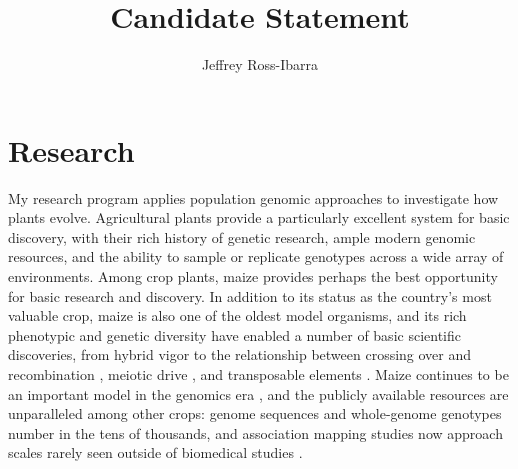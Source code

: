 \documentclass[11pt,letterpaper]{article}
\begin{document}
\title{\vspace{-5ex}Candidate Statement\vspace{-4ex}}
\author{Jeffrey Ross-Ibarra}
\date{}
\maketitle

\section*{Research}

My research program applies population genomic approaches to investigate how plants evolve.
Agricultural plants provide a particularly excellent system for basic discovery, with their rich history of genetic research, ample modern genomic resources, and the ability to sample or replicate genotypes across a wide array of environments.
Among crop plants, maize provides perhaps the best opportunity for basic research and discovery.
In addition to its status as the country's most valuable crop, maize is also one of the oldest model organisms, and its rich phenotypic and genetic diversity have enabled a number of basic scientific discoveries, from hybrid vigor \citep{shull1908composition} to the relationship between crossing over and recombination \citep{creighton1931correlation}, meiotic drive \citep{rhoades1942preferential}, and transposable elements \citep{mcclintock1950origin}. 
Maize continues to be an important model in the genomics era \citep{nannas2015genetic}, and the publicly available resources are unparalleled among other crops: genome sequences and whole-genome genotypes number in the tens of thousands, and association mapping studies now approach scales rarely seen outside of biomedical studies \citep[e.g.][]{buckler2009genetic,peiffer2014genetic,Romay2013,Hearne2015}.
\end{document}
